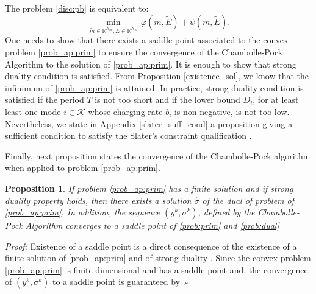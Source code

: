 \documentclass[conference]{IEEEtran}
\newtheorem{proposition}{Proposition}[section]
\newtheorem{remark}{Remark}[section]
\begin{document}
The problem \eqref{disc:pb} is equivalent to:
\begin{equation}
\label{prob_ap:prim}
\underset{\tilde{m}\in\mathbb{R}^{N_m},\tilde{E}\in\mathbb{R}^{N_E}}{\min}\,\varphi (\tilde{m},\tilde{E}) +\psi(\tilde{m},\tilde{E}).
\end{equation}
One needs to show that there exists a saddle point associated to the convex problem \eqref{prob_ap:prim} to ensure the convergence of the Chambolle-Pock Algorithm to the solution of \eqref{prob_ap:prim}. It is enough to show that strong duality condition is satisfied. From Proposition \ref{existence_sol}, we know that the infinimum of \eqref{prob_ap:prim} is attained. In practice, strong duality condition is satisfied if the period $T$ is not too short and if the lower bound  $\bar{D}_i$, for at least least one mode $i\in \mathcal{K}$ whose charging rate $b_i$ is non negative, is not too low. 
Nevertheless, we state in Appendix \ref{slater_suff_cond} a proposition giving a sufficient condition to satisfy the Slater’s constraint qualification \cite{boyd2004convex}.


Finally, next proposition states the convergence of the Chambolle-Pock algorithm when applied to problem \eqref{prob_ap:prim}.

\begin{proposition}
If problem \eqref{prob_ap:prim} has a finite solution and if strong duality property holds, then there exists a solution $\hat{\sigma}$ of the dual of problem of \eqref{prob_ap:prim}. In addition, the sequence $(y^k,\sigma^k)$, defined by the Chambolle-Pock Algorithm converges to a saddle point 
of \eqref{prob:prim} and \eqref{prob:dual}
\end{proposition}
\textit{Proof: }Existence of a saddle point is a direct consequence of the existence of a finite solution of \eqref{prob_ap:prim} and of strong duality \cite{boyd2004convex}. Since the convex problem  \eqref{prob_ap:prim} is finite dimensional and has a saddle point and, the convergence of  $(y^k,\sigma^k)$ to a saddle point is guaranteed by \cite[Theorem 1]{chambolle2011first}.\hfill{$\square$}
\end{document}
